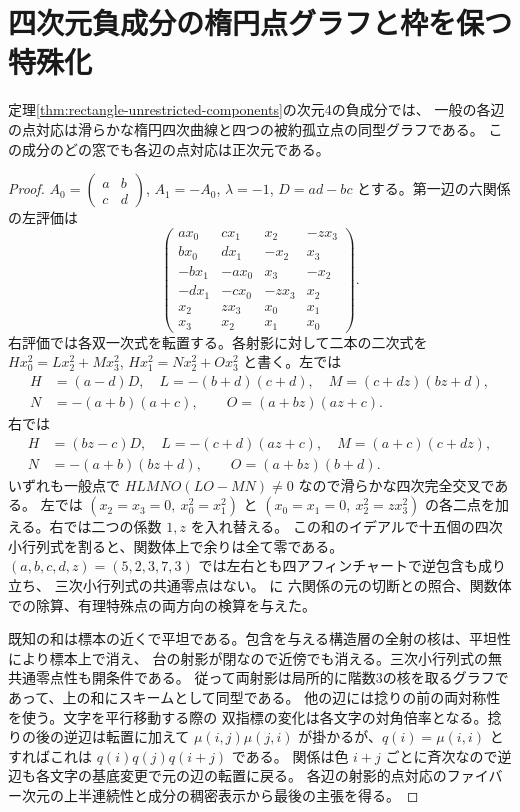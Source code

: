 \section{四次元負成分の楕円点グラフと枠を保つ特殊化}
\label{sec:rectangle-component-point-geometry}
\begin{theorem}\label{thm:negative-component-elliptic-graph}
定理\ref{thm:rectangle-unrestricted-components}の次元4の負成分では、
一般の各辺の点対応は滑らかな楕円四次曲線と四つの被約孤立点の同型グラフである。
この成分のどの窓でも各辺の点対応は正次元である。
\end{theorem}
\begin{proof}
$A_0=\left(\begin{smallmatrix}a&b\\c&d\end{smallmatrix}\right)$,
$A_1=-A_0$, $\lambda=-1$, $D=ad-bc$ とする。第一辺の六関係の左評価は
\[
\begin{pmatrix}
 ax_0&cx_1&x_2&-zx_3\\ bx_0&dx_1&-x_2&x_3\\
 -bx_1&-ax_0&x_3&-x_2\\ -dx_1&-cx_0&-zx_3&x_2\\
 x_2&zx_3&x_0&x_1\\ x_3&x_2&x_1&x_0
\end{pmatrix}.
\]
右評価では各双一次式を転置する。各射影に対して二本の二次式を
$Hx_0^2=Lx_2^2+Mx_3^2$, $Hx_1^2=Nx_2^2+Ox_3^2$ と書く。左では
\[
\begin{split}
 H&=(a-d)D,\quad L=-(b+d)(c+d),\quad M=(c+dz)(bz+d),\\
 N&=-(a+b)(a+c),\qquad O=(a+bz)(az+c).
\end{split}
\]
右では
\[
\begin{split}
 H&=(bz-c)D,\quad L=-(c+d)(az+c),\quad M=(a+c)(c+dz),\\
 N&=-(a+b)(bz+d),\qquad O=(a+bz)(b+d).
\end{split}
\]
いずれも一般点で $HLMNO(LO-MN)\ne0$ なので滑らかな四次完全交叉である。
左では $(x_2=x_3=0,\ x_0^2=x_1^2)$ と
$(x_0=x_1=0,\ x_2^2=zx_3^2)$ の各二点を加える。右では二つの係数 $1,z$ を入れ替える。
この和のイデアルで十五個の四次小行列式を割ると、関数体上で余りは全て零である。
$(a,b,c,d,z)=(5,2,3,7,3)$ では左右とも四アフィンチャートで逆包含も成り立ち、
三次小行列式の共通零点はない。 に
六関係の元の切断との照合、関数体での除算、有理特殊点の両方向の検算を与えた。

既知の和は標本の近くで平坦である。包含を与える構造層の全射の核は、平坦性により標本上で消え、
台の射影が閉なので近傍でも消える。三次小行列式の無共通零点性も開条件である。
従って両射影は局所的に階数3の核を取るグラフであって、上の和にスキームとして同型である。
他の辺には捻りの前の両対称性を使う。文字を平行移動する際の
双指標の変化は各文字の対角倍率となる。捻りの後の逆辺は転置に加えて
$\mu(i,j)\mu(j,i)$ が掛かるが、$q(i)=\mu(i,i)$ とすればこれは $q(i)q(j)q(i+j)$ である。
関係は色 $i+j$ ごとに斉次なので逆辺も各文字の基底変更で元の辺の転置に戻る。
各辺の射影的点対応のファイバー次元の上半連続性と成分の稠密表示から最後の主張を得る。
\end{proof}

